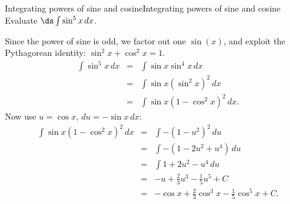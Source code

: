\begin{example}{Integrating powers of sine and cosine}{Integrating powers of sine and cosine}\label{Odd Power of Sine}
Evaluate $\ds\int \sin^5 x\,dx$.
\end{example}

\begin{solution} 
Since the power of sine is odd, we factor out one $ \sin(x) $, and exploit the Pythagorean identity: $\sin^2x+\cos^2x=1$.
\begin{eqnarray*}
  \int \sin^5 x\,dx&=&\int \sin x \sin^4 x\,dx\\
	&=&
  \int \sin x (\sin^2 x)^2\,dx\\
	&=&
  \int \sin x (1-\cos^2 x)^2\,dx.
\end{eqnarray*}%
Now use $u=\cos x$, $du=-\sin x\,dx$:
\begin{eqnarray*}
  \int \sin x (1-\cos^2 x)^2\,dx&=&\int -(1-u^2)^2\,du\\
  &=&\int -(1-2u^2+u^4)\,du\\
  &=&\int 1+2u^2-u^4\,du\\	
  &=&-u+{\frac{2}{3}}u^3-{\frac{1}{5}}u^5+C\\
  &=&-\cos x+\frac{2}{3}\cos^3 x-\frac{1}{5}\cos^5x+C.
\end{eqnarray*}\vskip-20pt
\end{solution}


